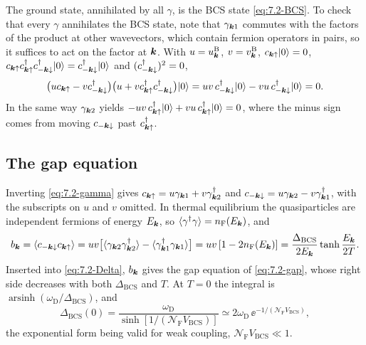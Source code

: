 The ground state, annihilated by all $\gamma$, is the BCS state \cref{eq:7.2-BCS}. To check that every $\gamma$ annihilates the BCS state, note that $\gamma_{\bm{k}1}$ commutes with the factors of the product at other wavevectors, which contain fermion operators in pairs, so it suffices to act on the factor at $\bm{k}$. With $u = u^{\mathrm{B}}_{\bm{k}}$, $v = v^{\mathrm{B}}_{\bm{k}}$, $c_{\bm{k}\uparrow}|0\rangle = 0$, $c_{\bm{k}\uparrow}c^\dagger_{\bm{k}\uparrow}c^\dagger_{-\bm{k}\downarrow}|0\rangle = c^\dagger_{-\bm{k}\downarrow}|0\rangle$ and $(c^\dagger_{-\bm{k}\downarrow})^2 = 0$,
\begin{equation*}
  \bigl(uc_{\bm{k}\uparrow} - vc^\dagger_{-\bm{k}\downarrow}\bigr)\bigl(u + vc^\dagger_{\bm{k}\uparrow}c^\dagger_{-\bm{k}\downarrow}\bigr)|0\rangle = uv\,c^\dagger_{-\bm{k}\downarrow}|0\rangle - vu\,c^\dagger_{-\bm{k}\downarrow}|0\rangle = 0 .
\end{equation*}
In the same way $\gamma_{\bm{k}2}$ yields $-uv\,c^\dagger_{\bm{k}\uparrow}|0\rangle + vu\,c^\dagger_{\bm{k}\uparrow}|0\rangle = 0$, where the minus sign comes from moving $c_{-\bm{k}\downarrow}$ past $c^\dagger_{\bm{k}\uparrow}$.

\subsection*{The gap equation}

Inverting \cref{eq:7.2-gamma} gives $c_{\bm{k}\uparrow} = u\gamma_{\bm{k}1} + v\gamma^\dagger_{\bm{k}2}$ and $c_{-\bm{k}\downarrow} = u\gamma_{\bm{k}2} - v\gamma^\dagger_{\bm{k}1}$, with the subscripts on $u$ and $v$ omitted. In thermal equilibrium the quasiparticles are independent fermions of energy $E_{\bm{k}}$, so $\langle\gamma^\dagger\gamma\rangle = n_{\mathrm{F}}(E_{\bm{k}})$, and
\begin{equation*}
  b_{\bm{k}} = \langle c_{-\bm{k}\downarrow}c_{\bm{k}\uparrow}\rangle = uv\bigl[\langle\gamma_{\bm{k}2}\gamma^\dagger_{\bm{k}2}\rangle - \langle\gamma^\dagger_{\bm{k}1}\gamma_{\bm{k}1}\rangle\bigr] = uv\,[1 - 2n_{\mathrm{F}}(E_{\bm{k}})] = \frac{\Delta_{\mathrm{BCS}}}{2E_{\bm{k}}}\tanh\frac{E_{\bm{k}}}{2T} .
\end{equation*}
Inserted into \cref{eq:7.2-Delta}, $b_{\bm{k}}$ gives the gap equation of \cref{eq:7.2-gap}, whose right side decreases with both $\Delta_{\mathrm{BCS}}$ and $T$. At $T = 0$ the integral is $\operatorname{arsinh}(\omega_{\mathrm{D}}/\Delta_{\mathrm{BCS}})$, and
\begin{equation*}
  \Delta_{\mathrm{BCS}}(0) = \frac{\omega_{\mathrm{D}}}{\sinh[1/(\mathcal{N}_{\mathrm{F}}V_{\mathrm{BCS}})]} \simeq 2\omega_{\mathrm{D}}\,\ee^{-1/(\mathcal{N}_{\mathrm{F}}V_{\mathrm{BCS}})} ,
\end{equation*}
the exponential form being valid for weak coupling, $\mathcal{N}_{\mathrm{F}}V_{\mathrm{BCS}} \ll 1$.

